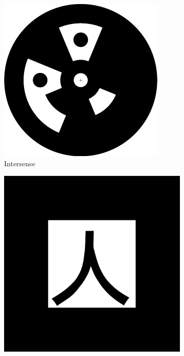 \documentclass[runningheads]{llncs}
\begin{document}
\begin{figure}
 \begin{subfigure}[b]{0.19\textwidth}
  \centering
  \includegraphics[width=\linewidth]{intersense.jpg}
  Intersense\cite{NaimarkF02}
 \end{subfigure}
 \begin{subfigure}[b]{0.19\textwidth}
 \centering
  \includegraphics[width=\linewidth]{pattKanji.pdf}

\end{subfigure}
\end{figure}
\end{document}
